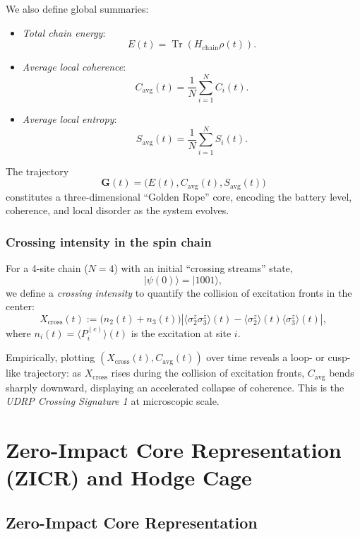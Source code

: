 \documentclass[11pt]{article}
\theoremstyle{definition}
\begin{document}
We also define global summaries:
\begin{itemize}
  \item \emph{Total chain energy}:
  \[
  E(t) = \operatorname{Tr}(H_{\text{chain}} \rho(t)).
  \]
  \item \emph{Average local coherence}:
  \[
  C_{\text{avg}}(t) = \frac{1}{N}\sum_{i=1}^{N} C_i(t).
  \]
  \item \emph{Average local entropy}:
  \[
  S_{\text{avg}}(t) = \frac{1}{N}\sum_{i=1}^{N} S_i(t).
  \]
\end{itemize}

The trajectory
\[
\mathbf{G}(t) = \big(E(t), C_{\text{avg}}(t), S_{\text{avg}}(t)\big)
\]
constitutes a three-dimensional ``Golden Rope'' core, encoding the battery level, coherence, and local disorder as the system evolves.

\subsubsection{Crossing intensity in the spin chain}

For a 4-site chain ($N=4$) with an initial ``crossing streams'' state,
\[
|\psi(0)\rangle = |1 0 0 1\rangle,
\]
we define a \emph{crossing intensity} to quantify the collision of excitation fronts in the center:
\begin{equation}
X_{\text{cross}}(t)
:= \big(n_2(t) + n_3(t)\big)
   \left|
     \langle \sigma_2^z \sigma_3^z \rangle(t)
     - \langle \sigma_2^z \rangle(t)\langle \sigma_3^z \rangle(t)
   \right|,
\end{equation}
where $n_i(t) = \langle P_i^{(e)} \rangle(t)$ is the excitation at site $i$.

Empirically, plotting $(X_{\text{cross}}(t), C_{\text{avg}}(t))$ over time reveals a loop- or cusp-like trajectory: as $X_{\text{cross}}$ rises during the collision of excitation fronts, $C_{\text{avg}}$ bends sharply downward, displaying an accelerated collapse of coherence. This is the \emph{UDRP Crossing Signature 1} at microscopic scale.

\section{Zero-Impact Core Representation (ZICR) and Hodge Cage}

\subsection{Zero-Impact Core Representation}
\end{document}
